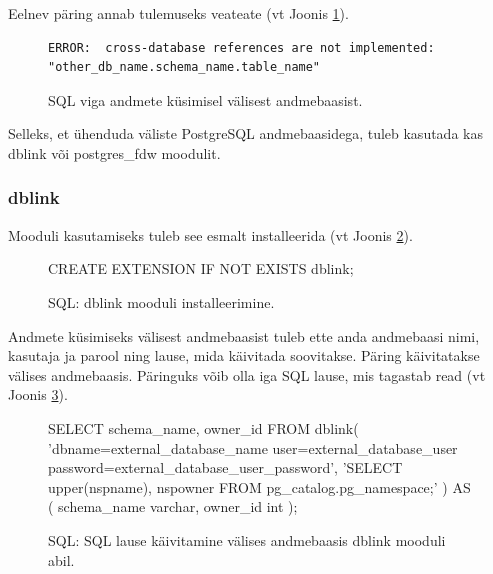 \documentclass[a4paper,12pt]{article} %
\begin{document}
Eelnev päring annab tulemuseks veateate (vt Joonis \ref{fig_sql_viga_andmete_küsimisel_välisest_andmebaasist}).
\begin{figure}[H]
\centering
\begin{lstlisting}
ERROR:  cross-database references are not implemented: "other_db_name.schema_name.table_name"
\end{lstlisting}
\caption{SQL viga andmete küsimisel välisest andmebaasist.}
\label{fig_sql_viga_andmete_küsimisel_välisest_andmebaasist}
\end{figure}

Selleks, et ühenduda väliste PostgreSQL andmebaasidega, tuleb kasutada kas dblink või postgres\_fdw moodulit.

\subsubsection{dblink}
\label{dblink}
Mooduli kasutamiseks tuleb see esmalt installeerida (vt Joonis \ref{fig_sql_dblink_mooduli_installeerimine}).
\begin{figure}[H]
\centering
\begin{SQL}
CREATE EXTENSION IF NOT EXISTS dblink;
\end{SQL}
\caption{SQL: dblink mooduli installeerimine.}
\label{fig_sql_dblink_mooduli_installeerimine}
\end{figure}
Andmete küsimiseks välisest andmebaasist tuleb ette anda andmebaasi nimi, kasutaja ja parool ning lause, mida käivitada soovitakse. Päring käivitatakse välises andmebaasis. Päringuks võib olla iga SQL lause, mis tagastab read (vt Joonis \ref{fig_sql_sql_lause_käivitamine_välises_andmebaasis_dblink_mooduli_abil}). \cite{PostgreSQLdblink}
\begin{figure}[H]
\centering
\begin{SQL}
SELECT schema_name, owner_id
FROM dblink(
  'dbname=external_database_name user=external_database_user password=external_database_user_password',
  'SELECT upper(nspname), nspowner FROM pg_catalog.pg_namespace;'
) AS (
  schema_name varchar,
  owner_id int
);
\end{SQL}
\caption{SQL: SQL lause käivitamine välises andmebaasis dblink mooduli abil.}
\label{fig_sql_sql_lause_käivitamine_välises_andmebaasis_dblink_mooduli_abil}
\end{figure}
\end{document}
